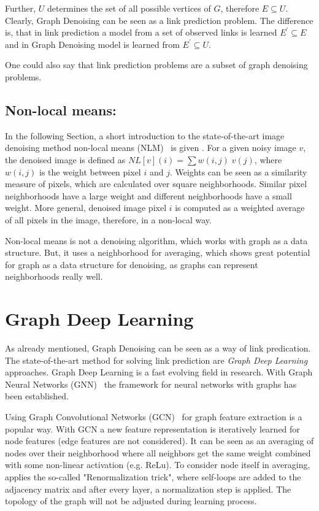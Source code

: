 Further, $U$ determines the set of all possible vertices of $G$, therefore $E \subseteq U$.
Clearly, Graph Denoising can be seen as a link prediction problem.
The difference is, that in link prediction a model from a set of observed links is learned
$E^{\prime} \subseteq E$ and in Graph Denoising model is learned from 
$E^{\prime} \subseteq U$. 

\begin{tcolorbox}[colback=red!5!white,colframe=red!75!black]
    One could also say that link prediction problems are a subset of graph denoising problems.
\end{tcolorbox}

\subsection{Non-local means:}
In the following Section, a short introduction to the 
state-of-the-art image denoising method non-local means (NLM)~\cite{noneLocalMean} is given .
For a given noisy image $v$, the denoised image is defined as $NL[v](i) = \sum{w(i,j) \; v(j)}$,
where $w(i,j)$ is the weight between pixel $i$ and $j$. 
Weights can be seen as a similarity measure of pixels, which are calculated over square neighborhoods.
Similar pixel neighborhoods have a large weight and different neighborhoods have a small weight.
More general, denoised image pixel $i$ is computed as a weighted average of all pixels in the 
image, therefore, in a non-local way.

Non-local means is not a denoising algorithm, which works with graph as a data structure.
But, it uses a neighborhood for averaging, which shows great potential for graph
as a data structure for denoising, as graphs can represent neighborhoods really well.


\section{Graph Deep Learning}
\label{sec:graph_depp_learning}
As already mentioned, Graph Denoising can be seen as a way of link predication. 
The state-of-the-art method for solving link prediction are \textit{Graph Deep Learning} approaches.
Graph Deep Learning is a fast evolving field in research. With Graph Neural Networks (GNN)~\cite{GNN} the framework
for neural networks with graphs has been established. 

Using Graph Convolutional Networks (GCN)~\cite{GCN} for graph feature extraction is a popular way. 
With GCN a new feature representation is iteratively learned for node features (edge features are not considered).
It can be seen as an averaging of nodes over their neighborhood where all neighbors get the same weight combined with some non-linear activation (e.g. ReLu). 
To consider node itself in averaging, \citet{GCN} applies the so-called "Renormalization trick", where self-loops are added to the 
adjacency matrix and after every layer, a normalization step is applied. 
The topology of the graph will not be adjusted during learning process.

